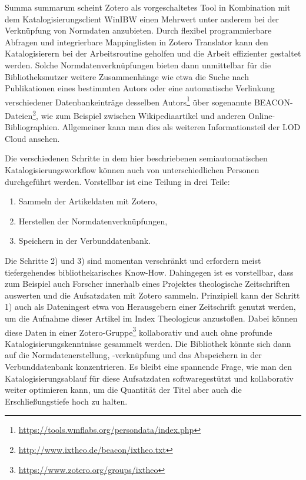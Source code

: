 \documentclass[a4paper,
fontsize=11pt,
oneside,
numbers=noperiodatend,
parskip=half-,
bibliography=totoc,
final
]{scrartcl}
\begin{document}
Summa summarum scheint Zotero als vorgeschaltetes Tool in Kombination
mit dem Katalogisierungsclient WinIBW einen Mehrwert unter anderem bei
der Verknüpfung von Normdaten anzubieten. Durch flexibel programmierbare
Abfragen und integrierbare Mappinglisten in Zotero Translator kann den
Katalogisierern bei der Arbeitsroutine geholfen und die Arbeit
effizienter gestaltet werden. Solche Normdatenverknüpfungen bieten dann
unmittelbar für die Bibliotheksnutzer weitere Zusammenhänge wie etwa die
Suche nach Publikationen eines bestimmten Autors oder eine automatische
Verlinkung verschiedener Datenbankeinträge desselben Autors\footnote{\url{https://tools.wmflabs.org/persondata/index.php}}
über sogenannte BEACON-Dateien\footnote{\url{http://www.ixtheo.de/beacon/ixtheo.txt}},
wie zum Beispiel zwischen Wikipediaartikel und anderen
Online-Bibliographien. Allgemeiner kann man dies als weiteren
Informationsteil der LOD Cloud ansehen.

Die verschiedenen Schritte in dem hier beschriebenen semiautomatischen
Katalogisierungsworkflow können auch von unterschiedlichen Personen
durchgeführt werden. Vorstellbar ist eine Teilung in drei Teile:

\begin{enumerate}
\def\labelenumi{\arabic{enumi}.}
\item
  Sammeln der Artikeldaten mit Zotero,
\item
  Herstellen der Normdatenverknüpfungen,
\item
  Speichern in der Ver\-bund\-daten\-bank.
\end{enumerate}

Die Schritte 2) und 3) sind momentan verschränkt und erfordern meist
tiefergehendes bibliothekarisches Know-How. Dahingegen ist es
vorstellbar, dass zum Beispiel auch Forscher innerhalb eines Projektes
theologische Zeitschriften auswerten und die Aufsatzdaten mit Zotero
sammeln. Prinzipiell kann der Schritt 1) auch als Dateningest etwa von
Herausgebern einer Zeitschrift genutzt werden, um die Aufnahme dieser
Artikel im Index Theologicus anzustoßen. Dabei können diese Daten in
einer Zotero-Gruppe\footnote{\url{https://www.zotero.org/groups/ixtheo}}
kollaborativ und auch ohne profunde Katalogisierungskenntnisse gesammelt
werden. Die Bibliothek könnte sich dann auf die Normdatenerstellung,
-verknüpfung und das Abspeichern in der Ver\-bund\-daten\-bank konzentrieren.
Es bleibt eine spannende Frage, wie man den Katalogisierungsablauf für
diese Aufsatzdaten softwaregestützt und kollaborativ weiter optimieren
kann, um die Quantität der Titel aber auch die Erschließungstiefe hoch
zu halten.
\end{document}

